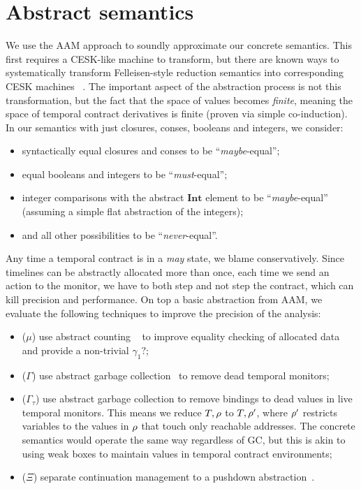 

\section{Abstract semantics}\label{sec:abstract-semantics}

We use the AAM approach to soundly approximate our concrete semantics.
%
This first requires a CESK-like machine to transform, but there are known ways to systematically transform Felleisen-style reduction semantics into corresponding CESK machines ~\citep{dvanhorn:Danvy-Nielsen:RS-04-26}.
%
The important aspect of the abstraction process is not this transformation, but the fact that the space of values becomes \emph{finite}, meaning the space of temporal contract derivatives is finite (proven via simple co-induction).
%
In our semantics with just closures, conses, booleans and integers, we consider:
\begin{itemize}
 \item syntactically equal closures and conses to be ``\emph{maybe}-equal'';
 \item equal booleans and integers to be ``\emph{must}-equal'';
 \item integer comparisons with the abstract $\mathbf{Int}$ element to be ``\emph{maybe}-equal'' (assuming a simple flat abstraction of the integers);
 \item and all other possibilities to be ``\emph{never}-equal''.
\end{itemize}
%
Any time a temporal contract is in a \emph{may} state, we blame conservatively.
%
Since timelines can be abstractly allocated more than once, each time we send an action to the monitor, we have to both step and not step the contract, which can kill precision and performance.
%
On top a basic abstraction from AAM, we evaluate the following techniques to improve the precision of the analysis:
\begin{itemize}
\item{($\mu$) use abstract counting ~\citep{dvanhorn:Might:2006:GammaCFA} to improve equality checking of allocated data and provide a non-trivial $\gamma_1?$;}
\item{($\Gamma$) use abstract garbage collection~\citep{dvanhorn:Might:2006:GammaCFA} to remove dead temporal monitors;}
\item{($\Gamma_\tau$) use abstract garbage collection to remove bindings to dead values in live temporal monitors.
%
This means we reduce $T,\rho$ to $T,\rho'$, where $\rho'$ restricts variables to the values in $\rho$ that touch only reachable addresses.
%
The concrete semantics would operate the same way regardless of GC, but this is akin to using weak boxes to maintain values in temporal contract environments;}
\item{($\Xi$) separate continuation management to a pushdown abstraction~\citep{dvanhorn:Vardoulakis2011CFA2}.}%
\end{itemize}

